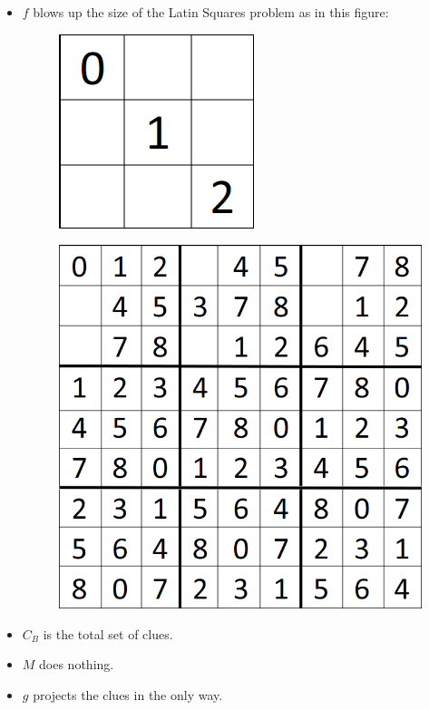 \documentclass[runningheads,a4paper]{llncs}
\begin{document}
\begin{itemize}
\item $f$ blows up the size of the Latin Squares problem as in this figure:  
\begin{figure}[H]
\label{fig:partialLS}
\centering
\includegraphics[scale=0.25]{sudoku-3.png}
\end{figure}

\begin{figure}[H]
\label{fig:partialNP}
\centering
\includegraphics[scale=0.25]{sudoku-1.png}
\end{figure}
\item $C_B$ is the total set of clues.
\item $M$ does nothing.
\item $g$ projects the clues in the only way.
\end{itemize}
\end{document}
